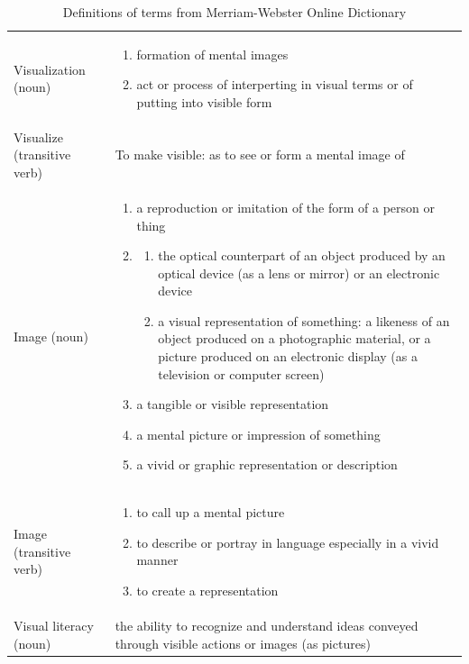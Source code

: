 \begin{table}[!htp]
\centering
\begin{tabular}{l p{10cm}}

Visualization (noun) &

\begin{enumerate}[leftmargin=*]
\item formation of mental images
\item act or process of interperting in visual terms or of putting into visible form
\end{enumerate}
\\[4ex]


Visualize (transitive verb) &
To make visible: as to see or form a mental image of
\\[4ex]


Image (noun) &
\begin{enumerate}[leftmargin=*]
\item a reproduction or imitation of the form of a person or thing
\item
    \begin{enumerate}
    \item the optical counterpart of an object produced by an optical device (as a lens or mirror) or an electronic device
    \item a visual representation of something: a likeness of an object produced on a photographic material, or a picture produced on an electronic display (as a television or computer screen)
    \end{enumerate}
\item a tangible or visible representation
\item a mental picture or impression of something
\item a vivid or graphic representation or description
\end{enumerate}
\\[4ex]

Image (transitive verb) &
\begin{enumerate}[leftmargin=*]
\item to call up a mental picture
\item to describe or portray in language especially in a vivid manner
\item to create a representation
\end{enumerate}
\\[4ex]


Visual literacy (noun) &
the ability to recognize and understand ideas conveyed through visible actions or images (as pictures)

\end{tabular}
\caption[
Definitions of terms from Merriam-Webster Online Dictionary, Urldate: 07.2016
    \newline\small\texttt{\url{http://www.merriam-webster.com/}}
]{Definitions of terms from Merriam-Webster Online Dictionary}
\label{tab:meriam-dict}
\end{table}

